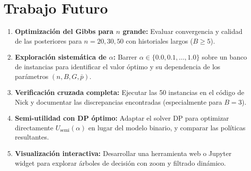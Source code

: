 \documentclass[11pt, a4paper]{article}
\begin{document}
\section{Trabajo Futuro}

\begin{enumerate}[nosep]
    \item \textbf{Optimizaci\'on del Gibbs para $n$ grande:} Evaluar
    convergencia y calidad de las posteriores para $n = 20, 30, 50$ con
    historiales largos ($B \geq 5$).

    \item \textbf{Exploraci\'on sistem\'atica de $\alpha$:} Barrer
    $\alpha \in \{0.0, 0.1, \ldots, 1.0\}$ sobre un banco de instancias
    para identificar el valor \'optimo y su dependencia de los par\'ametros
    $(n, B, G, \bar{p})$.

    \item \textbf{Verificaci\'on cruzada completa:} Ejecutar las 50
    instancias en el c\'odigo de Nick y documentar las discrepancias
    encontradas (especialmente para $B = 3$).

    \item \textbf{Semi-utilidad con DP \'optimo:} Adaptar el solver
    DP para optimizar directamente $U_{\text{semi}}(\alpha)$ en lugar
    del modelo binario, y comparar las pol\'iticas resultantes.

    \item \textbf{Visualizaci\'on interactiva:} Desarrollar una
    herramienta web o Jupyter widget para explorar \'arboles de
    decisi\'on con zoom y filtrado din\'amico.
\end{enumerate}
\end{document}
